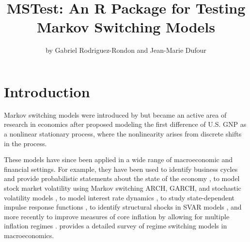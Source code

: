 \title{MSTest: An R Package for Testing Markov Switching Models}


\author{by Gabriel Rodriguez-Rondon and Jean-Marie Dufour}

\maketitle


\section{Introduction}\label{intro}

Markov switching models were introduced by \citet{goldfeld1973markov} but became an active area of research in economics after \citet{hamilton89} proposed modeling the first difference of U.S. GNP as a nonlinear stationary process, where the nonlinearity arises from discrete shifts in the process.

These models have since been applied in a wide range of macroeconomic and financial settings. For example, they have been used to identify business cycles and provide probabilistic statements about the state of the economy \citep{chauvet1998econometric, chauvet2006dating, chauvet2002markov, diebold1996measuring, hamilton89, kimnel1999, quqin2021}, to model stock market volatility using Markov switching ARCH, GARCH, and stochastic volatility models \citep{hamilton1994, gray1996, klaassen2002improving, haas2004new, pelletier2006regime, so1998stochastic}, to model interest rate dynamics \citep{cai1994markov, garper1996}, to study state-dependent impulse response functions \citep{sims2006were, caggiano2017}, to identify structural shocks in SVAR models \citep{lanne2010structural, herwartz2014structural, lutkepohl2021testing}, and more recently to improve measures of core inflation by allowing for multiple inflation regimes \citep{rodron_inf_2024, ahn2024common, le2024underlying}. \citet{hamilton2016} provides a detailed survey of regime switching models in macroeconomics.

